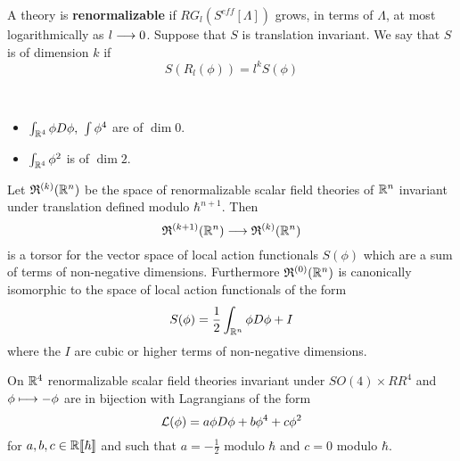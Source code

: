 \begin{definition}
  A theory is \textbf{renormalizable} if $RG_l(S^{eff}[\Lambda])$ grows, in terms of $\Lambda$, at most logarithmically as $l \longrightarrow 0$. Suppose that $S$ is translation invariant. We say that $S$ is of dimension $k$ if
  $$ S(R_l(\phi)) = l^k S(\phi) $$
\end{definition}

\begin{example}~
  \begin{itemize}
    \item $\int_{\RR^4} \phi D \phi, \ \int \phi^4$ are of $\dim 0$.
    \item $\int_{\RR^4} \phi^2$ is of $\dim 2$.
  \end{itemize}
\end{example}

\begin{theo}
  Let $\mathfrak{R}^{(k)}(\mathbb{R}^n)$ be the space of renormalizable scalar field theories of $\mathbb{R}^n$ invariant under translation defined modulo $\hbar^{n+1}$. Then
  $$  \mathfrak{R}^{(k+1)}(\mathbb{R}^n) \longrightarrow \mathfrak{R}^{(k)}(\mathbb{R}^n)$$
  is a torsor for the vector space of local action functionals $S(\phi)$ which are a sum of terms of non-negative dimensions. Furthermore $\mathfrak{R}^{(0)}(\mathbb{R}^n)$ is canonically isomorphic to the space of local action functionals of the form
  $$ S(\phi) = \frac{1}{2} \int_{\RR^n} \phi D \phi + I $$
  where the $I$ are cubic or higher terms of non-negative dimensions.
\end{theo}

\begin{corollary}
  On $\mathbb{R}^4$ renormalizable scalar field theories invariant under $SO(4) \times RR^4$ and $\phi \lmap -\phi$ are in bijection with Lagrangians of the form
  $$ \LL (\phi) = a \phi D \phi + b \phi^4 + c \phi^2 $$
  for $a,b,c \in \mathbb{R}\llbracket\hbar \rrbracket$ and such that $a = - \frac{1}{2}$ modulo $\hbar$ and $c = 0$ modulo $\hbar$.
\end{corollary}




\newpage
